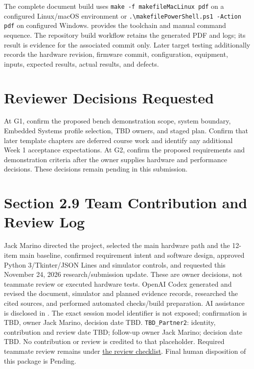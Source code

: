 The complete document build uses
\texttt{make -f makefileMacLinux pdf} on a configured Linux/macOS environment
or \texttt{.\textbackslash makefilePowerShell.ps1 -Action pdf} on configured Windows.
 provides the toolchain and manual command sequence.
The repository build workflow retains the generated PDF and logs; its result
is evidence for the associated commit only. Later target testing additionally
records the hardware revision, firmware commit, configuration, equipment,
inputs, expected results, actual results, and defects.

\section{Reviewer Decisions Requested}
At G1, confirm the proposed bench demonstration scope, system boundary,
Embedded Systems profile selection, TBD owners, and staged plan.
Confirm that later template chapters are deferred course work and identify any
additional Week 1 acceptance expectations. At G2, confirm the proposed
requirements and demonstration criteria after the owner supplies hardware and
performance decisions. These decisions remain pending in this submission.

\section{Section 2.9 Team Contribution and Review Log}
\label{Section:TeamContributionLog}
Jack Marino directed the project, selected the main hardware path and the
12-item main baseline, confirmed requirement intent and software design,
approved Python 3/Tkinter/JSON Lines and simulator controls, and requested
this November 24, 2026 research/submission update. These are owner decisions,
not teammate review or executed hardware tests.
OpenAI Codex generated and revised the document, simulator and planned
evidence records, researched the cited sources, and performed automated
checks/build preparation. AI assistance is disclosed in
. The exact session model identifier is not exposed;
confirmation is TBD, owner Jack Marino, decision date TBD.
\texttt{TBD\_Partner2}: identity, contribution and review date TBD; follow-up
owner Jack Marino; decision date TBD. No contribution or review is credited
to that placeholder. Required teammate review remains \StatusPending under
\hyperref[Section:HumanReviewChecklist]{the review checklist}. Final human
disposition of this package is Pending.
